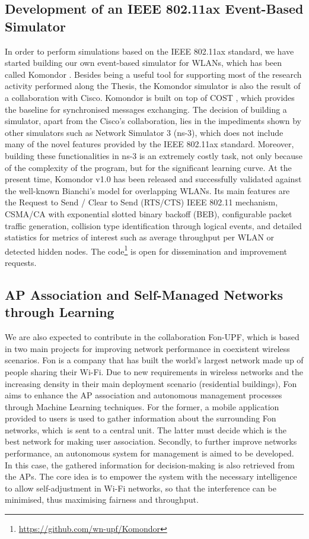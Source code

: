 \documentclass[12pt, a4paper,twoside]{tesi_upf}
\begin{document}
			\subsection{Development of an IEEE 802.11ax Event-Based Simulator}
			\label{section:cisco_project}				
				In order to perform simulations based on the IEEE 802.11ax standard, we have started building our own event-based simulator for WLANs, which has been called Komondor \cite{barrachina2017komondor}. Besides being a useful tool for supporting most of the research activity performed along the Thesis, the Komondor simulator is also the result of a collaboration with Cisco. Komondor is built on top of COST \cite{chen2005sense}, which provides the baseline for synchronised messages exchanging. The decision of building a simulator, apart from the Cisco's collaboration, lies in the impediments shown by other simulators such as Network Simulator 3 (ns-3), which does not include many of the novel features provided by the IEEE 802.11ax standard. Moreover, building these functionalities in ns-3 is an extremely costly task, not only because of the complexity of the program, but for the significant learning curve. At the present time, Komondor v1.0 has been released and successfully validated against the well-known Bianchi's model for overlapping WLANs. Its main features are the Request to Send / Clear to Send (RTS/CTS) IEEE 802.11 mechanism, CSMA/CA with exponential slotted binary backoff (BEB), configurable packet traffic generation, collision type identification through logical events, and detailed statistics for metrics of interest such as average throughput per WLAN or detected hidden nodes. The code\footnote{\url{https://github.com/wn-upf/Komondor}} is open for dissemination and improvement requests.
				
			\subsection{AP Association and Self-Managed Networks through Learning}
			\label{section:fon_project}	
				We are also expected to contribute in the collaboration Fon-UPF, which is based in two main projects for improving network performance in coexistent wireless scenarios. Fon is a company that has built the world's largest network made up of people sharing their Wi-Fi. Due to new requirements in wireless networks and the increasing density in their main deployment scenario (residential buildings), Fon aims to enhance the AP association and autonomous management processes through Machine Learning techniques. For the former, a mobile application provided to users is used to gather information about the surrounding Fon networks, which is sent to a central unit. The latter must decide which is the best network for making user association. Secondly, to further improve networks performance, an autonomous system for management is aimed to be developed. In this case, the gathered information for decision-making is also retrieved from the APs. The core idea is to empower the system with the necessary intelligence to allow self-adjustment in Wi-Fi networks, so that the interference can be minimised, thus maximising fairness and throughput.
			
\end{document}
